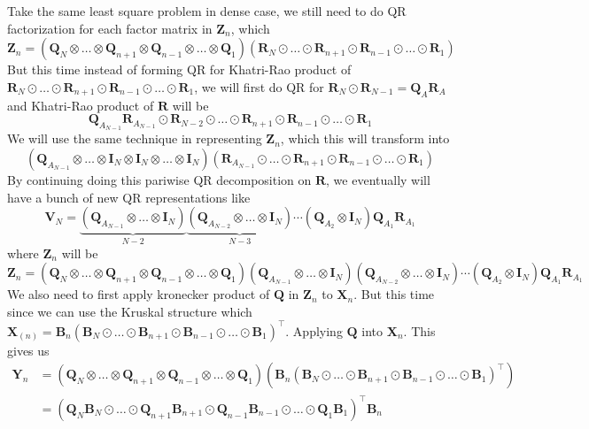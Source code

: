 \documentclass{article}
\newcommand{\mat}[1]{\mathbf{#1}}
\begin{document}
Take the same least square problem in dense case, we still need to do QR factorization for each factor matrix in $\mat{Z}_n$, which
$$\mat{Z}_n = (\mat{Q}_N \otimes \dots \otimes \mat{Q}_{n+1} \otimes \mat{Q}_{n-1} \otimes \dots \otimes \mat{Q}_1)(\mat{R}_N \odot \dots \odot \mat{R}_{n+1} \odot \mat{R}_{n-1} \odot \dots \odot \mat{R}_1)$$
But this time instead of forming QR for Khatri-Rao product of $\mat{R}_N \odot \dots \odot \mat{R}_{n+1} \odot \mat{R}_{n-1} \odot \dots \odot \mat{R}_1$, we will first do QR for $\mat{R}_N \odot \mat{R}_{N-1} = \mat{Q}_{A}\mat{R}_A$ and Khatri-Rao product of $\mat{R}$ will be 
$$\mat{Q}_{A_{N-1}}\mat{R}_{A_{N-1}} \odot \mat{R}_{N-2} \odot \dots \odot \mat{R}_{n+1} \odot \mat{R}_{n-1} \odot \dots \odot \mat{R}_1$$
We will use the same technique in representing $\mat{Z}_n$, which this will transform into 
$$(\mat{Q}_{A_{N-1}} \otimes \dots \otimes \mat{I}_N \otimes \mat{I}_N \otimes \dots  \otimes  \mat{I}_N)(\mat{R}_{A_{N-1}} \odot \dots \odot \mat{R}_{n+1} \odot \mat{R}_{n-1} \odot \dots \odot \mat{R}_1)$$
By continuing doing this pariwise QR decomposition on $\mat{R}$, we eventually will have a bunch of new QR representations like
$$\mat{V}_N = \underbrace{(\mat{Q}_{A_{N-1}} \otimes \dots  \otimes  \mat{I}_N)}_{N-2}\underbrace{(\mat{Q}_{A_{N-2}} \otimes \dots \otimes \mat{I}_N)}_{N-3} \cdots (\mat{Q}_{A_{2}} \otimes \mat{I}_N) \mat{Q}_{A_{1}}\mat{R}_{A_{1}}$$
where $\mat{Z}_n$ will be 
$$\mat{Z}_n = (\mat{Q}_N \otimes \dots \otimes \mat{Q}_{n+1} \otimes \mat{Q}_{n-1} \otimes \dots \otimes \mat{Q}_1) (\mat{Q}_{A_{N-1}} \otimes \dots  \otimes  \mat{I}_N)(\mat{Q}_{A_{N-2}} \otimes \dots \otimes \mat{I}_N) \cdots (\mat{Q}_{A_{2}} \otimes \mat{I}_N) \mat{Q}_{A_{1}}\mat{R}_{A_{1}}$$
We also need to first apply kronecker product of $\mat{Q}$ in $\mat{Z}_n$ to $\mat{X}_n$. But this time since we 
can use the Kruskal structure which $\mat{X}_{(n)} = \mat{B}_{n}(\mat{B}_{N} \odot \dots \odot \mat{B}_{n+1} \odot \mat{B}_{n-1}  \odot \dots \odot \mat{B}_{1})^\top$. Applying $\mat{Q}$ into 
$\mat{X}_n$. This gives us
\begin{align}
  \mat{Y}_n &= (\mat{Q}_N \otimes \dots \otimes \mat{Q}_{n+1} \otimes \mat{Q}_{n-1} \otimes \dots \otimes \mat{Q}_1)(\mat{B}_{n}(\mat{B}_{N} \odot \dots \odot \mat{B}_{n+1} \odot \mat{B}_{n-1}  \odot \dots \odot \mat{B}_{1})^\top) \nonumber \\
  &= (\mat{Q}_N\mat{B}_N \odot \dots \odot \mat{Q}_{n+1} \mat{B}_{n+1} \odot \mat{Q}_{n-1}\mat{B}_{n-1} \odot \dots \odot \mat{Q}_{1}\mat{B}_{1})^\top\mat{B}_n \nonumber   
\end{align}
\end{document}
